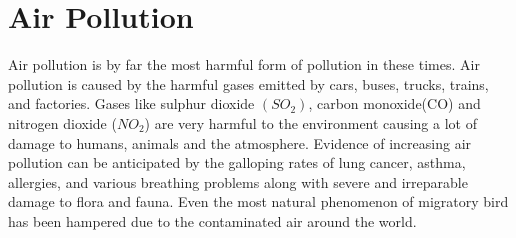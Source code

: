 


\section{Air Pollution}
Air pollution is by far the most harmful form of pollution in these times. Air pollution is caused by the harmful gases emitted by cars, buses, trucks, trains, and factories. Gases like sulphur dioxide $(SO_2)$, carbon monoxide(CO) and nitrogen dioxide ($NO_2$) are very harmful to the environment causing a lot of damage to humans, animals and the atmosphere. Evidence of increasing air pollution can be anticipated by the galloping rates of lung cancer, asthma, allergies, and various breathing problems along with severe and irreparable damage to flora and fauna. Even the most natural phenomenon of migratory bird has been hampered due to the contaminated air around the world.


